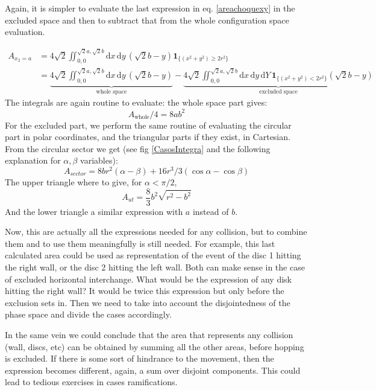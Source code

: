 \documentclass[superscriptaddress,pre,reprint,showpacs,onecolumn]{revtex4-1}
\newcommand{\rd}[1]{\mathrm{d}{#1} \,}
\newcommand{\indicatorsymbol}{\mathbf{1}}
\newcommand{\indicator}[1]{\indicatorsymbol_{ \{   #1 \} } }
\begin{document}
    Again, it is simpler to evaluate the last expression in eq. \ref{areachoquexy}
    in the excluded space and then to subtract that from the whole configuration
    space evaluation.

    \begin{align}
      A_{x_2=a} & =4\sqrt{2}\iint_{0,0}^{\sqrt{2}a,\sqrt{2}b}
        \rd x \rd y (\sqrt{2} b - y)
        \indicator{(x^2+y^2) \geq 2 r^2}\\
     &=\underbrace{4\sqrt{2}\iint_{0,0}^{\sqrt{2}a,\sqrt{2}b}
        \rd x \rd y (\sqrt{2} b - y)}_{\text{whole space}}
        -\underbrace{
          4\sqrt{2}\iint_{0,0}^{\sqrt{2}a,\sqrt{2}b}
        \rd x \rd y \rd Y 
        \indicator{(x^2+y^2) < 2 r^2}(\sqrt{2} b - y)}_{\text{excluded space}}
       \end{align}
    The integrals are again routine to evaluate: the whole space part
    gives:
    \begin{equation}
      A_{\text{whole}}/4=8ab^2
    \end{equation}
    For the excluded part, we perform the same routine of evaluating the circular part
    in polar coordinates, and the triangular parts if they exist, in Cartesian.
    From the circular sector we get (see fig \ref{CasosIntegra} and the following explanation
    for $\alpha, \beta$ variables):
    \begin{equation}
      A_{sector}=8 b r^2(\alpha-\beta)+16r^3/3(\cos\alpha - \cos\beta)
    \end{equation}
    The upper triangle where to give, for $\alpha < \pi/2$,
    \begin{equation}
    A_{ut}=\frac{8}{3}b^2\sqrt{r^2-b^2}
    \end{equation}
    And the lower triangle a similar expression with $a$ instead of $b$.

    Now, this are actually all the expressions needed for any collision, but
    to combine them and to use them meaningfully is still needed. For example,
    this last calculated area could be used as representation of the event of
    the disc 1 hitting the right wall, or the disc 2 hitting the left wall. Both
    can make sense in the case of excluded horizontal interchange. What would be
    the expression of any disk hitting the right wall? It would be twice this expression
    but only before the exclusion sets in. Then we need to take into account
    the disjointedness of the phase space and divide the cases accordingly.

    In the same vein we could conclude that the area that represents
    any collision (wall, discs, etc) can be obtained by summing all the other
    areas, before hopping is excluded. If there is some sort of hindrance to
    the movement, then the expression becomes different, again, a sum over
    disjoint components. This could lead to tedious exercises in cases ramifications.
\end{document}
